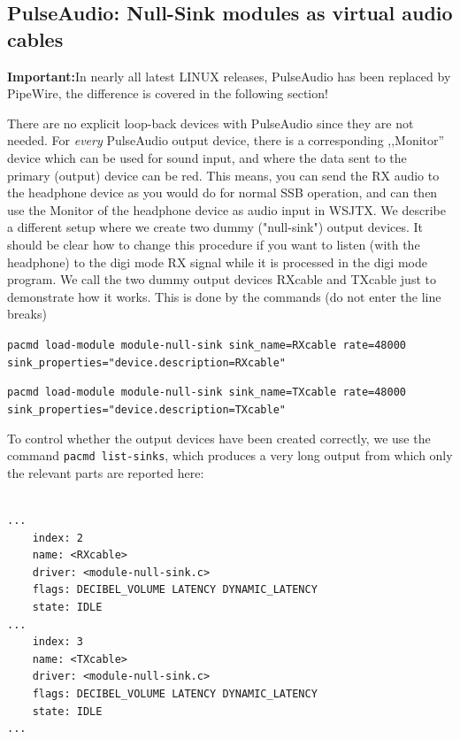\documentclass[12pt]{book}
\begin{document}
\subsection[PulseAudio: NullSink modules]{PulseAudio: Null-Sink modules as virtual audio cables}

\textbf{Important:}In nearly all latest LINUX releases, PulseAudio has been replaced by
PipeWire, the difference is covered in the following section!

There are no explicit loop-back devices with PulseAudio since they are not needed.
For \textit{every} PulseAudio output device, there is a corresponding ,,Monitor'' device
which can be used for sound input, and where the data sent to the primary (output) device
can be red. This means, you can send the RX audio to the headphone device as you would do
for normal SSB operation, and can then use the Monitor of the headphone device as audio
input in WSJTX. We describe a different setup where we create two dummy
 ("null-sink") output devices. It should be clear how to change this procedure if
 you want to listen (with the headphone) to the digi mode RX signal while it is processed
 in the digi mode program.  We call the two dummy output devices
 RXcable and TXcable just to demonstrate how it works.
  This is done by the commands (do not enter the line breaks)

\texttt{pacmd load-module module-null-sink sink\_name=RXcable rate=48000 \\
sink\_properties="device.description=RXcable"
}

\texttt{pacmd load-module module-null-sink sink\_name=TXcable rate=48000 \\
sink\_properties="device.description=TXcable"
}

To control whether the output devices have been created correctly, we use the command
\texttt{pacmd list-sinks}, which produces
a very long output from which only the relevant parts are reported here:

\begin{small}
\begin{verbatim}

...
    index: 2
	name: <RXcable>
	driver: <module-null-sink.c>
	flags: DECIBEL_VOLUME LATENCY DYNAMIC_LATENCY
	state: IDLE
...
    index: 3
	name: <TXcable>
	driver: <module-null-sink.c>
	flags: DECIBEL_VOLUME LATENCY DYNAMIC_LATENCY
	state: IDLE
...
\end{verbatim}
\end{small}
\end{document}
